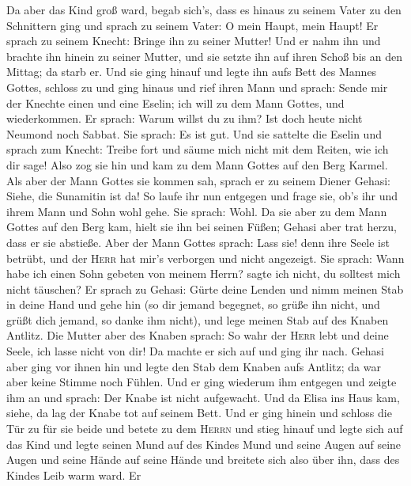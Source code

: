  Da aber das Kind groß ward, begab sich's, dass es hinaus
zu seinem Vater zu den Schnittern ging  und sprach zu
seinem Vater: O mein Haupt, mein Haupt! Er sprach zu seinem Knecht:
Bringe ihn zu seiner Mutter!  Und er nahm ihn und brachte
ihn hinein zu seiner Mutter, und sie setzte ihn auf ihren Schoß bis an
den Mittag; da starb er.  Und sie ging hinauf und legte
ihn aufs Bett des Mannes Gottes, schloss zu und ging hinaus
 und rief ihren Mann und sprach: Sende mir der Knechte
einen und eine Eselin; ich will zu dem Mann Gottes, und wiederkommen.
 Er sprach: Warum willst du zu ihm? Ist doch heute nicht
Neumond noch Sabbat. Sie sprach: Es ist gut.  Und sie
sattelte die Eselin und sprach zum Knecht: Treibe fort und säume mich
nicht mit dem Reiten, wie ich dir sage!  Also zog sie hin
und kam zu dem Mann Gottes auf den Berg Karmel. Als aber der Mann Gottes
sie kommen sah, sprach er zu seinem Diener Gehasi: Siehe, die Sunamitin
ist da!  So laufe ihr nun entgegen und frage sie, ob's
ihr und ihrem Mann und Sohn wohl gehe. Sie sprach: Wohl. 
Da sie aber zu dem Mann Gottes auf den Berg kam, hielt sie ihn bei
seinen Füßen; Gehasi aber trat herzu, dass er sie abstieße. Aber der
Mann Gottes sprach: Lass sie! denn ihre Seele ist betrübt, und der
\textsc{Herr} hat mir's verborgen und nicht angezeigt. 
Sie sprach: Wann habe ich einen Sohn gebeten von meinem Herrn? sagte ich
nicht, du solltest mich nicht täuschen?  Er sprach zu
Gehasi: Gürte deine Lenden und nimm meinen Stab in deine Hand und gehe
hin (so dir jemand begegnet, so grüße ihn nicht, und grüßt dich jemand,
so danke ihm nicht), und lege meinen Stab auf des Knaben Antlitz.
 Die Mutter aber des Knaben sprach: So wahr der
\textsc{Herr} lebt und deine Seele, ich lasse nicht von dir! Da machte
er sich auf und ging ihr nach.  Gehasi aber ging vor
ihnen hin und legte den Stab dem Knaben aufs Antlitz; da war aber keine
Stimme noch Fühlen. Und er ging wiederum ihm entgegen und zeigte ihm an
und sprach: Der Knabe ist nicht aufgewacht.  Und da Elisa
ins Haus kam, siehe, da lag der Knabe tot auf seinem Bett.
 Und er ging hinein und schloss die Tür zu für sie beide
und betete zu dem \textsc{Herrn}  und stieg hinauf und
legte sich auf das Kind und legte seinen Mund auf des Kindes Mund und
seine Augen auf seine Augen und seine Hände auf seine Hände und breitete
sich also über ihn, dass des Kindes Leib warm ward.  Er
